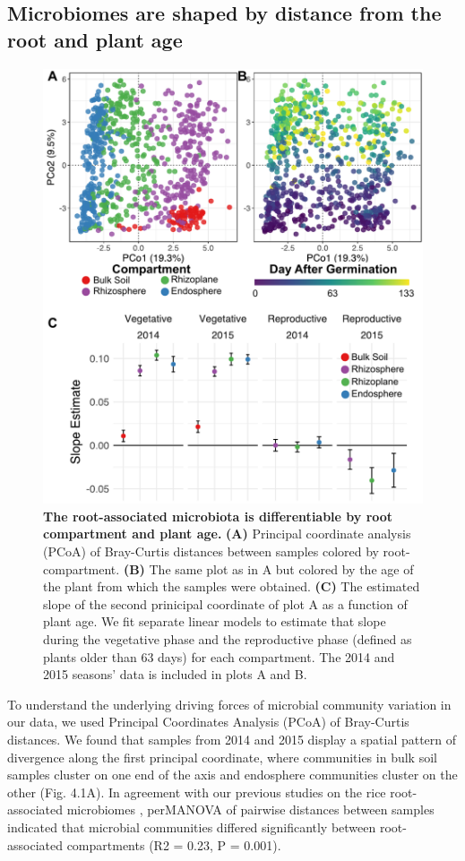 \subsection{Microbiomes are shaped by distance from the root and plant age}
\begin{figure}[h]
\centering
\includegraphics[width=5in]{Figures/figure3_1}
\caption[Figure 4.1]{\textbf{The root-associated microbiota is differentiable by root compartment and plant age.} \textbf{(A)} Principal coordinate analysis (PCoA) of Bray-Curtis distances between samples colored by root-compartment. \textbf{(B)} The same plot as in A but colored by the age of the plant from which the samples were obtained. \textbf{(C)} The estimated slope of the second prinicipal coordinate of plot A as a function of plant age. We fit separate linear models to estimate that slope during the vegetative phase and the reproductive phase (defined as plants older than 63 days) for each compartment. The 2014 and 2015 seasons' data is included in plots A and B.}
\label{Figure 4.1}
\end{figure}

To understand the underlying driving forces of microbial community variation in our data, we used Principal Coordinates Analysis (PCoA) of Bray-Curtis distances. We found that samples from 2014 and 2015 display a spatial pattern of divergence along the first principal coordinate, where communities in bulk soil samples cluster on one end of the axis and endosphere communities cluster on the other (Fig. 4.1A). In agreement with our previous studies on the rice root-associated microbiomes \cite{Edwards2015}, perMANOVA of pairwise distances between samples indicated that microbial communities differed significantly between root-associated compartments (R2 = 0.23, P = 0.001). 

